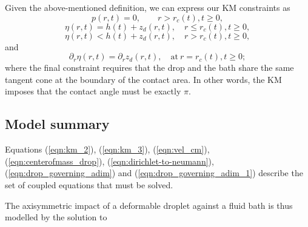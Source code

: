 \documentclass{jfm}
\begin{document}
Given the above-mentioned definition, we can express our KM constraints as
\begin{equation}\label{eqn:KM_press_outside}
    p(r, t) = 0, \qquad r > r_c(t), t \geq 0,
\end{equation}
\begin{equation}\label{eqn:KM_contact_match}
    \eta(r, t) = h(t) + z_d(r, t), \quad r \leq r_c(t), t\geq 0,
\end{equation}
\begin{equation}\label{eqn:no_intersection_condition}
    \eta(r, t) < h(t) + z_d(r, t), \quad  r > r_c(t), t\geq 0,
\end{equation}
and
\begin{equation}
    \label{eqn:km_tangency}
    \partial_r \eta(r, t) = \partial_r z_d(r, t), \quad \text{at} \  r = r_c(t), t \geq 0;
\end{equation}
where the final constraint requires that the drop and the bath share the same tangent cone at the boundary of the contact area. In other words, the KM imposes that the contact angle must be exactly $\pi$. 

\subsection{Model summary}\label{section:model_summary}

Equations (\ref{eqn:km_2}), (\ref{eqn:km_3}), 
(\ref{eqn:vel_cm}), (\ref{eqn:centerofmass_drop}), (\ref{eqn:dirichlet-to-neumann}), (\ref{eqn:drop_governing_adim}) and (\ref{eqn:drop_governing_adim_1}) describe the set of coupled equations that must be solved. 

The axisymmetric impact of a deformable droplet against a fluid bath is thus modelled by the solution to
\end{document}
